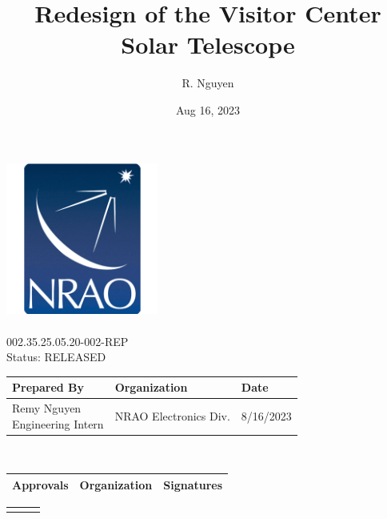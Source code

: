\documentclass[titlepage]{article}
\title{Redesign of the Visitor Center Solar Telescope}
\author{R. Nguyen
    }%
\date{Aug 16, 2023}
\def\docnum{002.35.25.05.20-002-REP}
\def\status{RELEASED}
\renewcommand{\arraystretch}{1.4}
\begin{document}
\setlength{\leftmargin}{1in}        %
\setlength{\rightmargin}{1in}       %
\setlength{\voffset}{-1.2in}        %
\setlength{\headheight}{3.5cm}      %
\setlength{\textheight}{591pt}      %
\setlength{\footskip}{60pt}         %

\thispagestyle{fancy}
\begin{center}
     \includegraphics[width=5cm]{images/NRAO Logo Badge.png} \\
     \vspace*{0.5cm}
     \textbf{\huge\thetitle} \\
     \vspace*{0.5cm}
     \large\docnum \\
     \Large Status: \status \\
     \vspace*{0.6cm} \large
     \begin{tabular}{|m{6.93cm}|m{4.5cm}|m{2cm}|} \hline
        \rowcolor{nraoblue}
        \textbf{Prepared By} & \textbf{Organization} & \textbf{Date} \\ \hline
        \makecell[l]{Remy Nguyen\\Engineering Intern} & NRAO Electronics Div. & 8/16/2023 \\ 
        \hline
    \end{tabular} \\
    \vspace*{0.8cm}
    \begin{tabular}{|m{3cm}|m{3.5cm}|m{6.93cm}|} \hline
        \rowcolor{nraoblue}
        \textbf{Approvals} & \textbf{Organization} & \textbf{Signatures} \\ \hline
    \end{tabular}
    \renewcommand{\arraystretch}{2}
    \begin{tabular}{|w{l}{3cm}|m{3.5cm}|m{6.93cm}|} \hline
        \parbox{3cm}{\raggedright
}
\end{tabular}
\end{center}
\end{document}
